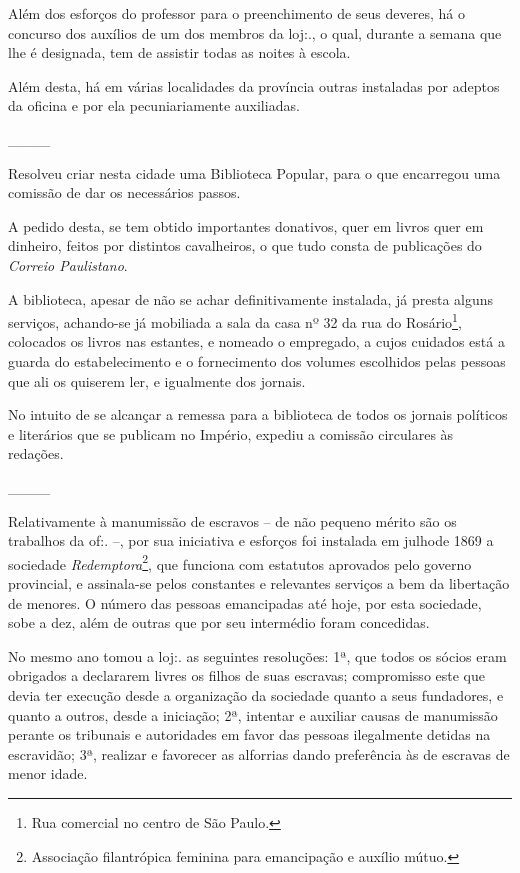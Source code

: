 Além dos esforços do professor para o preenchimento de seus deveres, há
o concurso dos auxílios de um dos membros da loj:., o qual, durante a
semana que lhe é designada, tem de assistir todas as noites à escola.

Além desta, há em várias localidades da província outras instaladas por
adeptos da oficina e por ela pecuniariamente auxiliadas.

\_\_\_\_

Resolveu criar nesta cidade uma Biblioteca Popular, para o que
encarregou uma comissão de dar os necessários passos.

A pedido desta, se tem obtido importantes donativos, quer em livros quer
em dinheiro, feitos por distintos cavalheiros, o que tudo consta de
publicações do \emph{Correio Paulistano}.

A biblioteca, apesar de não se achar definitivamente instalada, já
presta alguns serviços, achando-se já mobiliada a sala da casa nº 32 da
rua do Rosário\footnote{ Rua comercial no centro de São Paulo.},
colocados os livros nas estantes, e nomeado o empregado, a cujos
cuidados está a guarda do estabelecimento e o fornecimento dos volumes
escolhidos pelas pessoas que ali os quiserem ler, e igualmente dos
jornais.

No intuito de se alcançar a remessa para a biblioteca de todos os
jornais políticos e literários que se publicam no Império, expediu a
comissão circulares às redações.

\_\_\_\_

Relativamente à manumissão de escravos -- de não pequeno mérito são os
trabalhos da of:. --, por sua iniciativa e esforços foi instalada em
julhode 1869 a sociedade \emph{Redemptora}\footnote{ Associação
  filantrópica feminina para emancipação e auxílio mútuo.}, que funciona
com estatutos aprovados pelo governo provincial, e assinala-se pelos
constantes e relevantes serviços a bem da libertação de menores. O
número das pessoas emancipadas até hoje, por esta sociedade, sobe a dez,
além de outras que por seu intermédio foram concedidas.

No mesmo ano tomou a loj:. as seguintes resoluções: 1ª, que todos os
sócios eram obrigados a declararem livres os filhos de suas escravas;
compromisso este que devia ter execução desde a organização da sociedade
quanto a seus fundadores, e quanto a outros, desde a iniciação; 2ª,
intentar e auxiliar causas de manumissão perante os tribunais e
autoridades em favor das pessoas ilegalmente detidas na escravidão; 3ª,
realizar e favorecer as alforrias dando preferência às de escravas de
menor idade.

